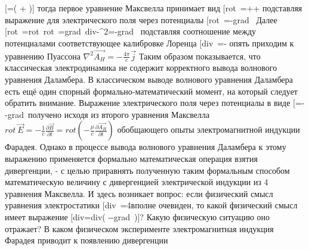 \documentclass[11pt]{article}
\begin{document}
{[}{{}\emph{{}}=\left(
+
\right){]} тогда первое уравнение Максвелла принимает вид
{[}rot~=++\overrightarrow{{{A}_{H}}}{]}
подставляя выражение для электрического поля через потенциалы
{[}rot~=-grad~\varphi {]}
Далее
{[}rot~=rot~rot~=grad~div-{{\nabla }^{2}}=-grad~\varphi {]}
подставляя соотношение между потенциалами соответствующее калибровке
Лоренца
{[}div~=-\frac{\partial \varphi }{\partial t}{]}
опять приходим к уравнению Пуассона
\({{\nabla }^{2}}\overrightarrow{{{A}_{H}}}=-\frac{4\pi }{c}\overrightarrow{j}\)
Таким образом показывается, что классическая электродинамика не содержит
корректного вывода волнового уравнения Даламбера. В классическом выводе
волнового уравнения Даламбера есть ещё один спорный
формально-математический момент, на который следует обратить внимание.
Выражение электрического поля через потенциалы в виде
{[}=--grad~\varphi {]}получено
исходя из второго уравнения Максвелла
\(rot\ \overrightarrow{E}=-\frac{1}{c}\frac{\partial \overrightarrow{B}}{\partial t}=rot\left( -\frac{\mu }{c}\frac{\partial \overrightarrow{{{A}_{H}}}}{\partial t} \right)\)
обобщающего опыты электромагнитной индукции Фарадея. Однако в процессе
вывода волнового уравнения Даламбера к этому выражению применяется
формально математическая операция взятия дивергенции, - с целью
приравнять полученную таким формальным способом математическую величину
с дивергенцией электрической индукции из 4 уравнения Максвелла. И здесь
возникает вопрос: если физический смысл уравнения электростатики
{[}div~=4\pi \rho {]}вполне очевиден, то какой
физический смысл имеет выражение {[}div=div\left(
--grad~\varphi  \right){]}?
Какую физическую ситуацию оно отражает? В каком физическом эксперименте
электромагнитная индукция Фарадея приводит к появлению дивергенции
}
\end{document}
